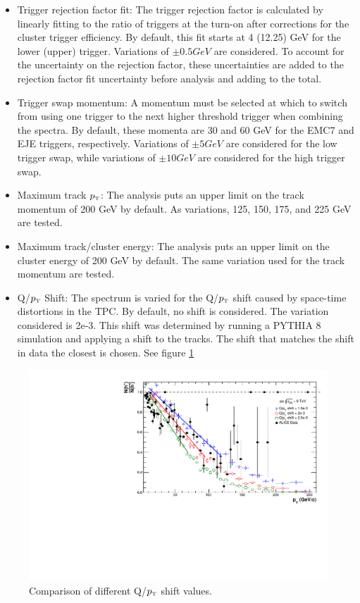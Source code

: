 \documentclass[ALICE]{ALICE_analysis_notes}
\newcommand{\pT}{$p_{\mbox{\tiny T}}$\xspace}
\begin{document}
\begin{itemize}
    \item Trigger rejection factor fit: The trigger rejection factor is calculated by linearly fitting to the ratio of triggers at the turn-on after corrections for the cluster trigger efficiency. By default, this fit starts at 4 (12.25) GeV for the lower (upper) trigger. Variations of $\pm 0.5 GeV$ are considered. To account for the uncertainty on the rejection factor, these uncertainties are added to the rejection factor fit uncertainty before analysis and adding to the total.
    
    \item Trigger swap momentum: A momentum must be selected at which to switch from using one trigger to the next higher threshold trigger when combining the spectra. By default, these momenta are 30 and 60 GeV for the EMC7 and EJE triggers, respectively. Variations of $\pm 5 GeV$ are considered for the low trigger swap, while variations of $\pm 10 GeV$ are considered for the high trigger swap.
    
    \item Maximum track \pT: The analysis puts an upper limit on the track momentum of 200 GeV by default. As variations, 125, 150, 175, and 225 GeV are tested.
    
    \item Maximum track/cluster energy: The analysis puts an upper limit on the cluster energy of 200 GeV by default. The same variation used for the track momentum are tested.
    
    \item Q/\pT Shift: The spectrum is varied for the Q/\pT shift caused by space-time distortions in the TPC. By default, no shift is considered. The variation considered is 2e-3. This shift was determined by running a PYTHIA 8 simulation and applying a shift to the tracks. The shift that matches the shift in data the closest is chosen. See figure \ref{fig:QoverPtShift}
\end{itemize}

\begin{figure}
    \centering
    \includegraphics[width=15cm]{figures/QoverPtShift/QPTComparison.pdf}
    \caption{Comparison of different Q/\pT shift values.}
    \label{fig:QoverPtShift}
\end{figure}
\end{document}
